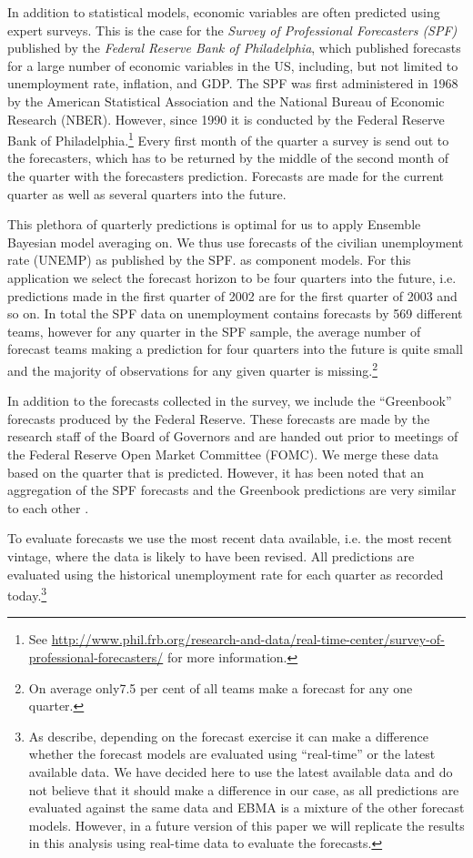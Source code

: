 \documentclass[12pt,fullpage,endnotes]{article}
\begin{document}
In addition to statistical models, economic variables are often predicted using expert surveys. This is the case for the \textit{Survey of Professional Forecasters (SPF)} published by the \textit{Federal Reserve Bank of Philadelphia}, which published forecasts for a large number of economic variables in the US, including, but not limited to unemployment rate, inflation, and GDP. The SPF was first administered in 1968 by the American Statistical Association and the National Bureau of Economic Research (NBER). However, since 1990 it is conducted by the Federal Reserve Bank of Philadelphia.\footnote{See \url{http://www.phil.frb.org/research-and-data/real-time-center/survey-of-professional-forecasters/} for more information.} Every first month of the quarter a survey is send out to the forecasters, which has to be returned by the middle of the second month of the quarter with the forecasters prediction. Forecasts are made for the current quarter as well as several quarters into the future. 

This plethora of quarterly predictions is optimal for us to apply Ensemble Bayesian model averaging on. We thus use forecasts of the civilian unemployment rate (UNEMP) as published by the SPF. as component models. For this application we select the forecast horizon to be four quarters into the future, i.e. predictions made in the first quarter of 2002 are for the first quarter of 2003 and so on. In total the SPF data on unemployment contains forecasts by 569 different teams, however for any quarter in the SPF sample, the average number of forecast teams making a prediction for four quarters into the future is quite small and the majority of observations for any given quarter is missing.\footnote{On average only7.5 per cent of all teams make a forecast for any one quarter.}

In addition to the forecasts collected in the survey, we include the ``Greenbook'' forecasts produced by the Federal Reserve. These forecasts are made by the research staff of the Board of Governors and are handed out prior to meetings of the Federal Reserve Open Market Committee (FOMC). We merge these data based on the quarter that is predicted. However, it has been noted that an aggregation of the SPF forecasts and the Greenbook predictions are very similar to each other \citep{Baghestani:2008}. 

To evaluate forecasts we use the most recent data available, i.e. the most recent vintage, where the data is likely to have been revised. All predictions are evaluated using the historical unemployment rate for each quarter as recorded today.\footnote{As \citet{Croushore:Stark:2001} describe, depending on the forecast exercise it can make a difference whether the forecast models are evaluated using ``real-time'' or the latest available data. We have decided here to use the latest available data and do not believe that it should make a difference in our case, as all predictions are evaluated against the same data and EBMA is a mixture of the other forecast models. However, in a future version of this paper we will replicate the results in this analysis using real-time data to evaluate the forecasts.}
\end{document}

